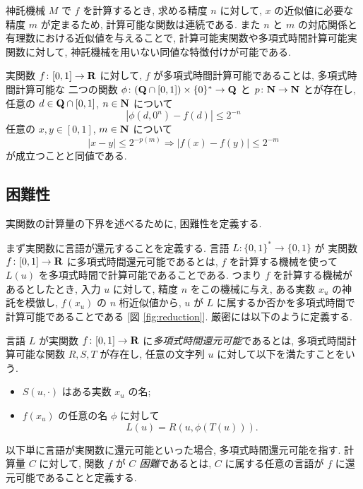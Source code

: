  神託機械 $M$ で $f$ を計算するとき, 求める精度 $n$ に対して,
 $x$ の近似値に必要な精度 $m$ が定まるため,
 計算可能な関数は連続である.
 また $n$ と $m$ の対応関係と有理数における近似値を与えることで,
 計算可能実関数や多項式時間計算可能実関数に対して,
 神託機械を用いない同値な特徴付けが可能である.

\begin{lemma}
  \label{lem:type1representation}
  実関数 $f\colon [0,1] \to \mathbf R$ に対して,
  $f$ が多項式時間計算可能であることは, 
  多項式時間計算可能な
  二つの関数 $\phi \colon (\mathbf Q \cap [0, 1]) \times \{0\}^* \to \mathbf Q$ と
  $p \colon \mathbf N \to \mathbf N$ とが存在し, 
  任意の $d \in \mathbf Q \cap [0,1]$, $n \in \mathbf N$ について
  \begin{equation}
   |\phi(d, 0^n) - f(d)| \le 2^{-n} 
  \end{equation}
  任意の $x, y \in [0, 1]$, $m \in \mathbf N$ について
  \begin{equation}
   |x-y| \le 2^{-p(m)} \Rightarrow |f(x) - f(y)| \le 2^{-m} 
  \end{equation}
  が成立つことと同値である. 
\end{lemma}



\subsection{困難性}

 実関数の計算量の下界を述べるために, 困難性を定義する.

 まず実関数に言語が還元することを定義する.
 言語 $L \colon \{0, 1\} ^* \to \{0, 1\}$ が
 実関数 $f\colon [0,1] \to \mathbf R$ に多項式時間還元可能であるとは,
 $f$ を計算する機械を使って $L(u)$ を多項式時間で計算可能であることである.
 つまり $f$ を計算する機械があるとしたとき, 入力 $u$ に対して,
 精度 $n$ をこの機械に与え, ある実数 $x_u$ の神託を模倣し, $f(x_u)$ の $n$ 桁近似値から,
 $u$ が $L$ に属するか否かを多項式時間で計算可能であることである
 [図 \ref{fig:reduction}].
 厳密には以下のように定義する.

 \begin{definition}[多項式時間還元可能]
  言語 $L$ が実関数 $f\colon [0,1] \to \mathbf R$ に\emph{多項式時間還元可能}であるとは, 
  多項式時間計算可能な関数 $R,S,T$ が存在し, 
  任意の文字列 $u$ に対して以下を満たすことをいう. 
  \begin{itemize}
   \item $S(u, \cdot)$ はある実数 $x_u$ の名;
   \item $f(x_u)$ の任意の名 $\phi$ に対して
	 \[
	  L(u) = R(u, \phi(T(u))).
	 \]
  \end{itemize}
 \end{definition}
 以下単に言語が実関数に還元可能といった場合, 多項式時間還元可能を指す.
 計算量 $C$ に対して, 関数 $f$ が \emph{$C$ 困難}であるとは,
 $C$ に属する任意の言語が $f$ に還元可能であることと定義する.

